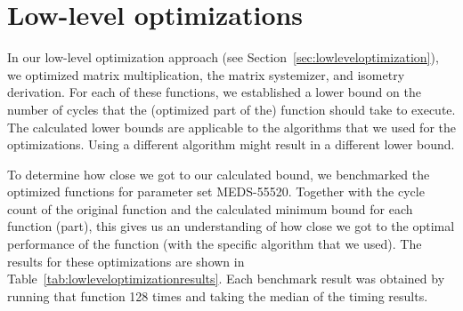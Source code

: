 \documentclass[11pt,a4paper]{report}
\theoremstyle{definition}
\begin{document}
\section{Low-level optimizations}
\label{sec:resultslowlevel}
In our low-level optimization approach (see Section~\ref{sec:lowleveloptimization}), we optimized matrix multiplication, the matrix systemizer, and isometry derivation. For each of these functions, we established a lower bound on the number of cycles that the (optimized part of the) function should take to execute. The calculated lower bounds are applicable to the algorithms that we used for the optimizations. Using a different algorithm might result in a different lower bound.

To determine how close we got to our calculated bound, we benchmarked the optimized functions for parameter set MEDS-55520. Together with the cycle count of the original function and the calculated minimum bound for each function (part), this gives us an understanding of how close we got to the optimal performance of the function (with the specific algorithm that we used). The results for these optimizations are shown in Table~\ref{tab:lowleveloptimizationresults}. Each benchmark result was obtained by running that function 128 times and taking the median of the timing results.
\end{document}
